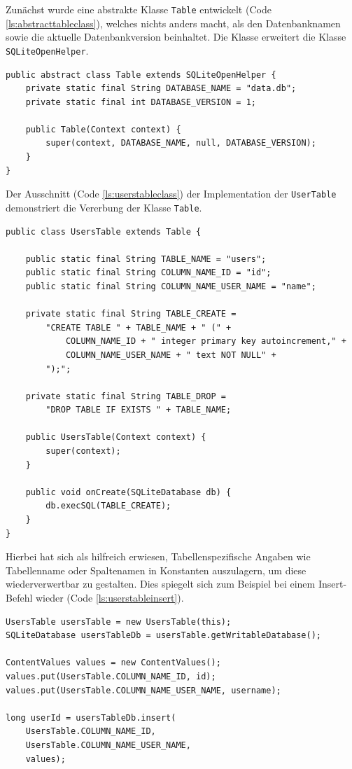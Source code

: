 Zunächst wurde eine abstrakte Klasse \texttt{Table} entwickelt (Code \ref{ls:abstracttableclass}), welches nichts anders macht, als den Datenbanknamen sowie die aktuelle Datenbankversion beinhaltet. Die Klasse erweitert die Klasse \texttt{SQLiteOpenHelper}.

\begin{lstlisting}[label=ls:abstracttableclass,caption=Abstrakte Klasse \texttt{Table}]
public abstract class Table extends SQLiteOpenHelper {
	private static final String DATABASE_NAME = "data.db";
	private static final int DATABASE_VERSION = 1;

	public Table(Context context) {
		super(context, DATABASE_NAME, null, DATABASE_VERSION);
	}
}
\end{lstlisting}

Der Ausschnitt (Code \ref{ls:userstableclass}) der Implementation der \texttt{UserTable} demonstriert die Vererbung der Klasse \texttt{Table}.

\begin{lstlisting}[label=ls:userstableclass,caption=Ausschnitt aus der Klasse \texttt{UsersTable}]
public class UsersTable extends Table {

	public static final String TABLE_NAME = "users";
	public static final String COLUMN_NAME_ID = "id";
	public static final String COLUMN_NAME_USER_NAME = "name";

	private static final String TABLE_CREATE =
		"CREATE TABLE " + TABLE_NAME + " (" +
			COLUMN_NAME_ID + " integer primary key autoincrement," +
			COLUMN_NAME_USER_NAME + " text NOT NULL" +
		");";

	private static final String TABLE_DROP =
		"DROP TABLE IF EXISTS " + TABLE_NAME;

	public UsersTable(Context context) {
		super(context);
	}

	public void onCreate(SQLiteDatabase db) {
		db.execSQL(TABLE_CREATE);
	}
}
\end{lstlisting}

Hierbei hat sich als hilfreich erwiesen, Tabellenspezifische Angaben wie Tabellenname oder Spaltenamen in Konstanten auszulagern, um diese wiederverwertbar zu gestalten. Dies spiegelt sich zum Beispiel bei einem Insert-Befehl wieder (Code \ref{ls:userstableinsert}).

\begin{lstlisting}[label=ls:userstableinsert,caption=Exemplarisches Insert in die „UsersTable“]
UsersTable usersTable = new UsersTable(this);
SQLiteDatabase usersTableDb = usersTable.getWritableDatabase();

ContentValues values = new ContentValues();
values.put(UsersTable.COLUMN_NAME_ID, id);
values.put(UsersTable.COLUMN_NAME_USER_NAME, username);

long userId = usersTableDb.insert(
	UsersTable.COLUMN_NAME_ID,
	UsersTable.COLUMN_NAME_USER_NAME,
	values);
\end{lstlisting}

